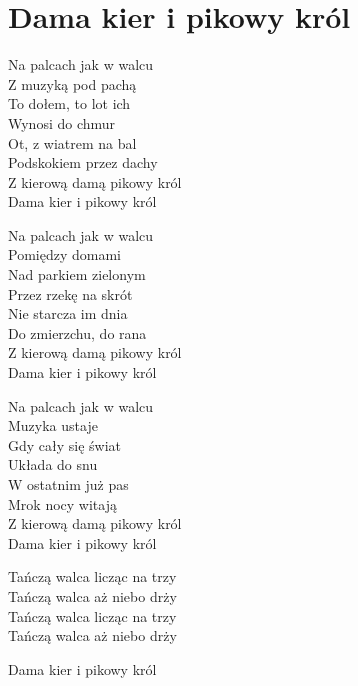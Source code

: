 \section{Dama kier i pikowy król}
\begin{text}
Na palcach jak w walcu\\
Z muzyką pod pachą\\
To dołem, to lot ich\\
Wynosi do chmur\\
Ot, z wiatrem na bal\\
Podskokiem przez dachy\\
Z kierową damą pikowy król\\
Dama kier i pikowy król

Na palcach jak w walcu\\
Pomiędzy domami\\
Nad parkiem zielonym\\
Przez rzekę na skrót\\
Nie starcza im dnia\\
Do zmierzchu, do rana\\
Z kierową damą pikowy król\\
Dama kier i pikowy król

Na palcach jak w walcu\\
Muzyka ustaje\\
Gdy cały się świat\\
Układa do snu\\
W ostatnim już pas\\
Mrok nocy witają\\
Z kierową damą pikowy król\\
Dama kier i pikowy król

Tańczą walca licząc na trzy\\
Tańczą walca aż niebo drży\\
Tańczą walca licząc na trzy\\
Tańczą walca aż niebo drży

Dama kier i pikowy król
\end{text}